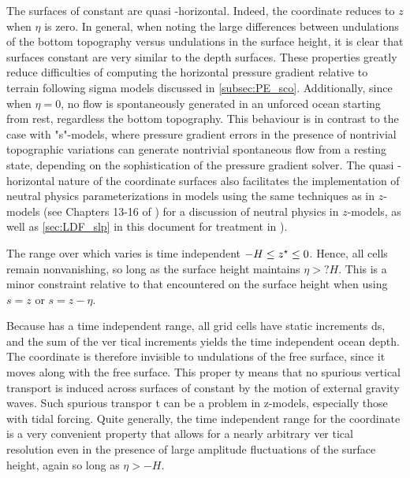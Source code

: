 \documentclass[../main/NEMO_manual]{subfiles}
\begin{document}
The surfaces of constant \zstar are quasi -horizontal.
Indeed, the \zstar coordinate reduces to $z$ when $\eta$ is zero.
In general, when noting the large differences between
undulations of the bottom topography versus undulations in the surface height,
it is clear that surfaces constant \zstar are very similar to the depth surfaces.
These properties greatly reduce difficulties of computing the horizontal pressure gradient relative to
terrain following sigma models discussed in \autoref{subsec:PE_sco}.
Additionally, since \zstar when $\eta = 0$,
no flow is spontaneously generated in an unforced ocean starting from rest, regardless the bottom topography.
This behaviour is in contrast to the case with "s"-models, where pressure gradient errors in the presence of
nontrivial topographic variations can generate nontrivial spontaneous flow from a resting state,
depending on the sophistication of the pressure gradient solver.
The quasi -horizontal nature of the coordinate surfaces also facilitates the implementation of
neutral physics parameterizations in \zstar models using the same techniques as in $z$-models
(see Chapters 13-16 of \cite{Griffies_Bk04}) for a discussion of neutral physics in $z$-models,
as well as \autoref{sec:LDF_slp} in this document for treatment in \NEMO).

The range over which \zstar varies is time independent $-H \leq z^\star \leq 0$.
Hence, all cells remain nonvanishing, so long as the surface height maintains $\eta > ?H$.
This is a minor constraint relative to that encountered on the surface height when using $s = z$ or $s = z - \eta$.

Because \zstar has a time independent range, all grid cells have static increments ds,
and the sum of the ver tical increments yields the time independent ocean depth. %
The \zstar coordinate is therefore invisible to undulations of the free surface,
since it moves along with the free surface.
This proper ty means that no spurious vertical transport is induced across surfaces of constant \zstar by
the motion of external gravity waves.
Such spurious transpor t can be a problem in z-models, especially those with tidal forcing.
Quite generally, the time independent range for the \zstar coordinate is a very convenient property that
allows for a nearly arbitrary ver tical resolution even in the presence of large amplitude fluctuations of
the surface height, again so long as $\eta > -H$.

\newpage 

\end{document}
